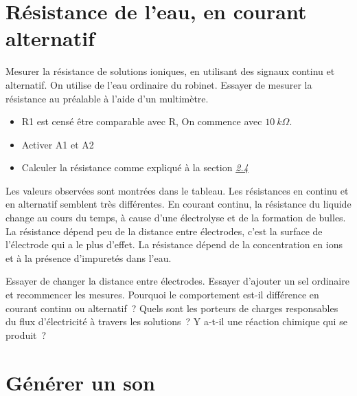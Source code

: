 \documentclass[a4paper,12pt,french]{sphinxmanual}
\let\sphinxpxdimen\pdfpxdimen\else\newdimen\sphinxpxdimen
\begin{document}
\section{Résistance de l’eau, en courant alternatif}
\label{\detokenize{2.14:resistance-de-leau-en-courant-alternatif}}\label{\detokenize{2.14::doc}}

Mesurer la résistance de solutions ioniques, en utilisant des signaux
continu et alternatif. On utilise de l’eau ordinaire du robinet. Essayer
de mesurer la résistance au préalable à l’aide d’un
multimètre.

\noindent\sphinxincludegraphics[width=300\sphinxpxdimen]{{res-water}.pdf}
\noindent\sphinxincludegraphics[width=300\sphinxpxdimen]{{water-conduct}.pdf}

\begin{itemize}
\item {} 
R1 est censé être comparable avec R, On commence avec \(10~k\Omega\).

\item {} 
Activer A1 et A2

\item {} 
Calculer la résistance comme expliqué à la section
{\hyperref[\detokenize{2.14:sec:Measure-resistance-by-comparison}]{\emph{2.4}}}

\end{itemize}


Les valeurs observées sont montrées dans le tableau. Les résistances en
continu et en alternatif semblent très différentes. En courant continu,
la résistance du liquide change au cours du temps, à cause d’une
électrolyse et de la formation de bulles. La résistance dépend peu de la
distance entre électrodes, c’est la surface de l’électrode qui a le plus
d’effet. La résistance dépend de la concentration en ions et à la
présence d’impuretés dans l’eau.

Essayer de changer la distance entre électrodes. Essayer d’ajouter un
sel ordinaire et recommencer les mesures. Pourquoi le comportement
est-il différence en courant continu ou alternatif ? Quels sont les
porteurs de charges responsables du flux d’électricité à travers les
solutions ? Y a-t-il une réaction chimique qui se produit ?


\section{Générer un son}
\label{\detokenize{2.15:generer-un-son}}\label{\detokenize{2.15::doc}}
\end{document}
